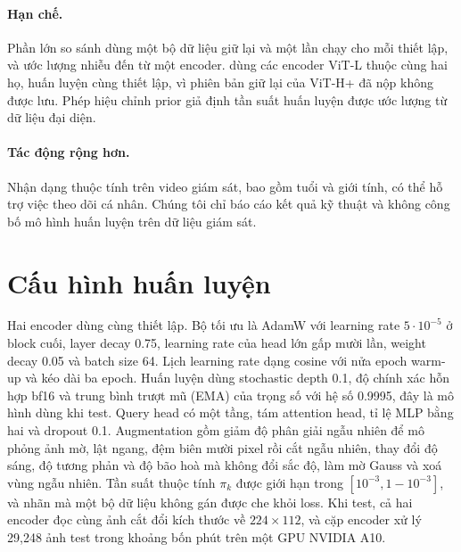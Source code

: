 \documentclass[10pt,twocolumn,letterpaper]{article}
\begin{document}
\paragraph{Hạn chế.}\label{sec:limits} Phần lớn so sánh dùng một bộ dữ liệu giữ lại và một lần chạy cho mỗi thiết lập, và ước lượng nhiễu đến từ một encoder.  dùng các encoder ViT-L thuộc cùng hai họ, huấn luyện cùng thiết lập, vì phiên bản giữ lại của ViT-H+ đã nộp không được lưu. Phép hiệu chỉnh prior giả định tần suất huấn luyện được ước lượng từ dữ liệu đại diện.

\paragraph{Tác động rộng hơn.} Nhận dạng thuộc tính trên video giám sát, bao gồm tuổi và giới tính, có thể hỗ trợ việc theo dõi cá nhân. Chúng tôi chỉ báo cáo kết quả kỹ thuật và không công bố mô hình huấn luyện trên dữ liệu giám sát.

{\small


}

\clearpage
\appendix
\section{Cấu hình huấn luyện}
\label{app:config}

Hai encoder dùng cùng thiết lập. Bộ tối ưu là AdamW với learning rate $5\cdot10^{-5}$ ở block cuối, layer decay 0.75, learning rate của head lớn gấp mười lần, weight decay 0.05 và batch size 64. Lịch learning rate dạng cosine với nửa epoch warm-up và kéo dài ba epoch. Huấn luyện dùng stochastic depth 0.1, độ chính xác hỗn hợp bf16 và trung bình trượt mũ (EMA) của trọng số với hệ số 0.9995, đây là mô hình dùng khi test. Query head có một tầng, tám attention head, tỉ lệ MLP bằng hai và dropout 0.1. Augmentation gồm giảm độ phân giải ngẫu nhiên để mô phỏng ảnh mờ, lật ngang, đệm biên mười pixel rồi cắt ngẫu nhiên, thay đổi độ sáng, độ tương phản và độ bão hoà mà không đổi sắc độ, làm mờ Gauss và xoá vùng ngẫu nhiên. Tần suất thuộc tính $\pi_k$ được giới hạn trong $[10^{-3},1-10^{-3}]$, và nhãn mà một bộ dữ liệu không gán được che khỏi loss. Khi test, cả hai encoder đọc cùng ảnh cắt đổi kích thước về $224\times112$, và cặp encoder xử lý 29{,}248 ảnh test trong khoảng bốn phút trên một GPU NVIDIA A10.
\end{document}
